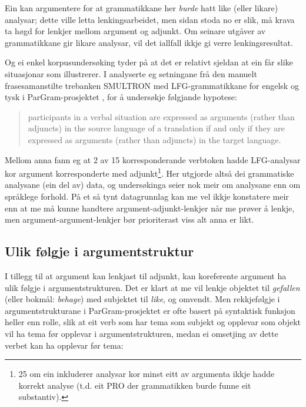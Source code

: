 \documentclass[12pt,a4paper,oneside,draft]{report}
\begin{document}
Ein kan argumentere for at grammatikkane her \emph{burde} hatt like (eller
likare) analysar; dette ville letta lenkingsarbeidet, men sidan stoda
no er slik, må krava ta høgd for lenkjer mellom argument og
adjunkt. Om seinare utgåver av grammatikkane gir likare analysar, vil
det iallfall ikkje gi verre lenkingsresultat.

Og ei enkel korpusundersøking tyder på at det er relativt sjeldan at
ein får slike situasjonar som \Last illustrerer.  I
\citet{unhammer2009aaa} analyserte eg setningane frå den manuelt
frasesamanstilte trebanken SMULTRON \citep{samuelsson2006pap} med
LFG-grammatikkane for engelsk og tysk i ParGram-prosjektet
\citep{butt2002pgp}, for å undersøkje følgjande hypotese:
\begin{quote}
participants in a verbal situation are expressed as
arguments (rather than adjuncts) in the source language of a
translation if and only if they are expressed as arguments (rather
than adjuncts) in the target language.
\end{quote}

Mellom anna fann eg at 2 av 15 korresponderande verbtoken hadde
LFG-analysar kor argument korresponderte med adjunkt\footnote{25 om ein inkluderer analysar kor minst eitt av argumenta
        ikkje hadde korrekt analyse (t.d. eit \textsc{PRO} der
        grammatikken burde funne eit substantiv). }. Her
utgjorde altså dei grammatiske analysane (ein del av) data, og
undersøkinga seier nok meir om analysane enn om språklege forhold. På
et så tynt datagrunnlag kan me vel ikkje konstatere meir enn at me må
kunne handtere argument-adjunkt-lenkjer når me prøver å lenkje, men
argument-argument-lenkjer bør prioriterast viss alt anna er likt.

\subsection{Ulik følgje i argumentstruktur}
\label{sec-3.6.2}

I tillegg til at argument kan lenkjast til adjunkt, kan koreferente
argument ha ulik følgje i argumentstrukturen. Det er klart at me vil
lenkje objektet til \emph{gefallen} (eller bokmål: \emph{behage}) med subjektet
til \emph{like}, og omvendt.  Men rekkjefølgje i argumentstrukturane i
ParGram-prosjektet er ofte basert på syntaktisk funksjon heller enn
rolle, slik at eit verb som har tema som subjekt og opplevar som
objekt vil ha tema før opplevar i argumentstrukturen, medan ei
omsetjing av dette verbet kan ha opplevar før tema:
\end{document}
